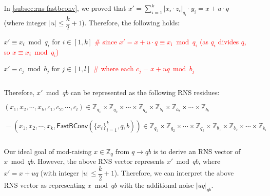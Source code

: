 \begin{myproof}

In \autoref{subsec:rns-fastbconv}, we proved that $x' = \sum\limits_{i=1}^{k} |x_i \cdot z_i|_{q_i} \cdot y_i = x + u\cdot q$ (where integer $|u| \leq \dfrac{k}{2}+1$). Therefore, the following holds:

$x' \equiv x_i \bmod q_i$ for $i \in [1, k]$ \textcolor{red}{ \# since $x' = x + u\cdot q \equiv x_i \bmod q_i$ (as $q_i$ divides $q$, so $x \equiv x_i \bmod q_i$)}

$x' \equiv c_j \bmod b_j$ for $j \in [1, l]$ \textcolor{red}{ \# where each $c_j = x + uq \bmod b_j$}

$ $

Therefore, $x' \bmod qb$ can be represented as the following RNS residues: 

$(x_1, x_2, \cdots, x_k, c_1, c_2, \cdots, c_l) \in \mathbb{Z}_{q_1} \times \mathbb{Z}_{q_2} \times \cdots \times \mathbb{Z}_{q_k} \times \mathbb{Z}_{b_1} \times \mathbb{Z}_{b_2} \times \cdots \times \mathbb{Z}_{b_l}$

$ = (x_1, x_2, \cdots, x_k, \textsf{FastBConv}(\{x_i\}_{i=1}^k, q, b)) \in \mathbb{Z}_{q_1} \times \mathbb{Z}_{q_2} \times \cdots \times \mathbb{Z}_{q_k} \times \mathbb{Z}_{b_1} \times \mathbb{Z}_{b_2} \times \cdots \times \mathbb{Z}_{b_l}$ 

$ $

Our ideal goal of mod-raising $x \in \mathbb{Z}_q$ from $q \rightarrow qb$ is to derive an RNS vector of $x \bmod qb$. However, the above RNS vector represents $x' \bmod qb$, where $x' = x + uq$ (with integer $|u| \leq \dfrac{k}{2}+1$). Therefore, we can interpret the above RNS vector as representing $x \bmod qb$ with the additional noise $|uq|_{qb}$.





\end{myproof}

